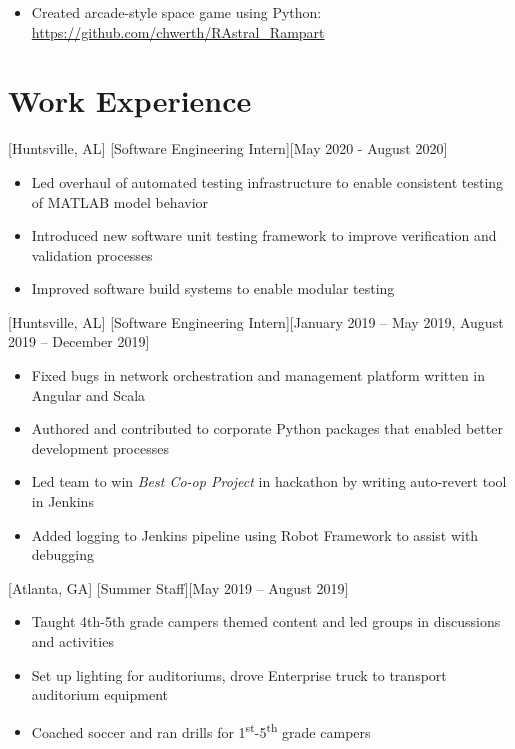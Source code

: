 \documentclass[hidelinks, 11pt]{article}
\newcommand{\link}[1]{{\color{blue}\href{#1}{#1}}}
\begin{document}
\begin{itemize}
  \item Created arcade-style space game using Python: \link{https://github.com/chwerth/RAstral\_Rampart}
\end{itemize}\leavevmode

\section{Work Experience}

[Huntsville, AL]
[Software Engineering Intern][May 2020 - August 2020]

\begin{itemize}
  \item Led overhaul of automated testing infrastructure to enable consistent testing of MATLAB model behavior
  \item Introduced new software unit testing framework to improve verification and validation processes
  \item Improved software build systems to enable modular testing
\end{itemize}\leavevmode

[Huntsville, AL]
[Software Engineering Intern][January 2019 – May 2019, August 2019 – December 2019]

\begin{itemize}
  \item Fixed bugs in network orchestration and management platform written in Angular and Scala
  \item Authored and contributed to corporate Python packages that enabled better development processes
  \item Led team to win \textit{Best Co-op Project} in hackathon by writing auto-revert tool in Jenkins
  \item Added logging to Jenkins pipeline using Robot Framework to assist with debugging
\end{itemize}\leavevmode

[Atlanta, GA]
[Summer Staff][May 2019 – August 2019]

\begin{itemize}
  \item Taught 4th-5th grade campers themed content and led groups in discussions and activities
  \item Set up lighting for auditoriums, drove Enterprise truck to transport auditorium equipment
  \item Coached soccer and ran drills for 1\textsuperscript{st}-5\textsuperscript{th} grade campers
\end{itemize}\leavevmode
\end{document}

